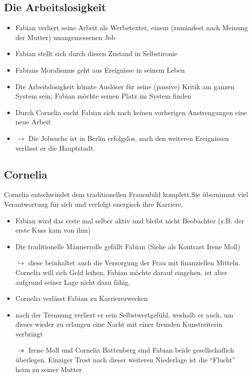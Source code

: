 \documentclass[a4paper,9pt]{article}
\begin{document}
\subsection{Die Arbeitslosigkeit}
\begin{itemize}
 \item Fabian verliert seine Arbeit als Werbetexter, einem (zumindest nach Meinung der Mutter) unangemessenen Job
 \item Fabian stellt sich durch diesen Zustand in Selbstironie
 \item Fabians Moralismus geht aus Ereignisse in seinem Leben 
 \item Die Arbeitslosigkeit könnte Auslöser für seine (passive) Kritik am ganzen System sein; Fabian möchte seinen Platz im System finden
 \item Durch Cornelia sucht Fabian sich nach keinen vorherigen Anstrengungen eine neue Arbeit
 \item $\rightarrow$ Die Jobsuche ist in Berlin erfolgslos, nach den weiteren Ereignissen verlässt er die Hauptstadt.
\end{itemize}

\subsection{Cornelia}
Cornelia entschwindet dem traditionellen Frauenbild komplett.Sie übernimmt viel Verantwortung für sich und verfolgt energisch ihre Karriere.
\begin{itemize}
 \item Fabian wird das erste mal selber aktiv und bleibt nicht Beobachter (z.B. der erste Kuss kam von ihm)
 \item Die traditionelle Männerrolle gefällt Fabian (Siehe als Kontrast Irene Moll)
 \item[$\hookrightarrow$] diese beinhaltet auch die Versorgung der Frau mit finanziellen Mitteln. Cornelia will sich Geld leihen, Fabian möchte darauf eingehen, ist aber aufgrund seiner Lage nicht dazu fähig.
 \item Cornelia verlässt Fabian zu Karrierezwecken
 \item nach der Trennung verliert er sein Selbstwertgefühl, weshalb er auch, um dieses wieder zu erlangen eine Nacht mit einer fremden Kunstreiterin verbringt
 \item[$\twoheadrightarrow$] Irene Moll und Cornelia Battenberg sind Fabian beide gesellschaflich überlegen. Einziger Trost nach dieser weiteren Niederlage ist die ``Flucht'' heim zu seiner Mutter
\end{itemize}
\end{document}
